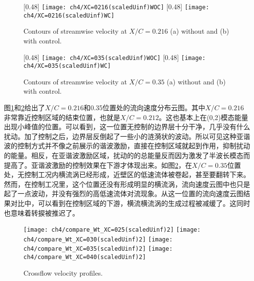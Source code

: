 \begin{figure}[htb]
\centering
\subcaptionbox{\label{fig:ContU0216WOC}}[0.48\linewidth]{           %
\texttt{[image: ch4/XC=0216(scaledUinf)WOC]}}
\subcaptionbox{\label{fig:ContU0216WC}}[0.48\linewidth]{
\texttt{[image: ch4/XC=0216(scaledUinf)WC]}}
\caption{Contours of streamwise velocity at $X/C=0.216$ (a) without  and (b) with control.}
\label{fig:ContU0216} %
\end{figure}
\begin{figure}[htb]
\centering
\subcaptionbox{\label{fig:ContU0350WOC}}[0.48\linewidth]{           %
\texttt{[image: ch4/XC=035(scaledUinf)WOC]}}
\subcaptionbox{\label{fig:ContU0350WC}}[0.48\linewidth]{
\texttt{[image: ch4/XC=035(scaledUinf)WC]}}
\caption{Contours of streamwise velocity at $X/C=0.35$ (a) without  and (b) with control.}
\label{fig:ContU0350} %
\end{figure}
图\ref{fig:ContU0216}和\ref{fig:ContU0350}给出了$X/C=0.216$和0.35位置处的流向速度分布云图。其中$X/C=0.216$非常靠近控制区域的结束位置，也就是$X/C=0.212$。这也基本上在(0,2)模态能量出现小峰值的位置。可以看到，这一位置无控制的边界层十分干净，几乎没有什么扰动。加了控制之后，边界层反倒起了一些小的涟漪状的波动。所以可见这种亚谐波的控制方式并不像之前展示的谐波激励，直接在控制区域就起到作用，抑制扰动的能量。相反，在亚谐波激励区域，扰动的的总能量反而因为激发了半波长模态而提高了。亚谐波激励的控制效果在下游才体现出来。如图\ref{fig:ContU0350}，在$X/C=0.35$位置处，无控制工况内横流涡已经形成，近壁区的低速流体被卷起，甚至要翻转下来。然而，在控制工况里，这个位置还没有形成明显的横流涡，流向速度云图中也只是起了一点波动，并没有强烈的高低速流体对流现象。从这一位置的流向速度云图结果对比中，可以看到在控制区域的下游，横流横流涡的生成过程被减缓了。这同时也意味着转捩被推迟了。
\begin{figure}
\centering
\texttt{[image: ch4/compare\_Wt\_XC=025(scaledUinf)2]}
\texttt{[image: ch4/compare\_Wt\_XC=030(scaledUinf)2]}
\texttt{[image: ch4/compare\_Wt\_XC=035(scaledUinf)2]}
\texttt{[image: ch4/compare\_Wt\_XC=040(scaledUinf)2]}
\caption{Crossflow velocity profiles.}%
\label{f:CFprofiles}
\end{figure}


